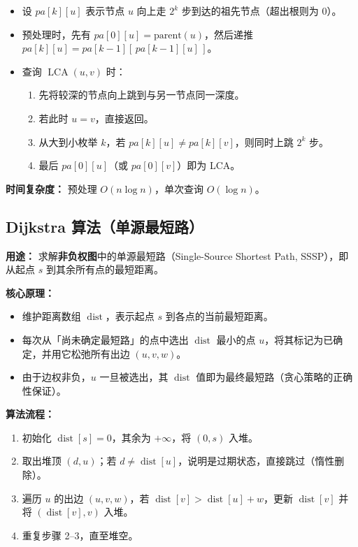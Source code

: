 \begin{itemize}
  \item 设 $pa[k][u]$ 表示节点 $u$ 向上走 $2^k$ 步到达的祖先节点（超出根则为 $0$）。
  \item 预处理时，先有 $pa[0][u] = \text{parent}(u)$，然后递推 $pa[k][u] = pa[k-1][\,pa[k-1][u]\,]$。
  \item 查询 $\operatorname{LCA}(u, v)$ 时：
    \begin{enumerate}
      \item 先将较深的节点向上跳到与另一节点同一深度。
      \item 若此时 $u = v$，直接返回。
      \item 从大到小枚举 $k$，若 $pa[k][u] \neq pa[k][v]$，则同时上跳 $2^k$ 步。
      \item 最后 $pa[0][u]$（或 $pa[0][v]$）即为 LCA。
    \end{enumerate}
\end{itemize}

\textbf{时间复杂度：} 预处理 $O(n \log n)$，单次查询 $O(\log n)$。



\subsection{Dijkstra 算法（单源最短路）}

\textbf{用途：} 求解\textbf{非负权图}中的单源最短路（Single-Source Shortest Path, SSSP），即从起点 $s$ 到其余所有点的最短距离。

\textbf{核心原理：}

\begin{itemize}
  \item 维护距离数组 $\operatorname{dist}$，表示起点 $s$ 到各点的当前最短距离。
  \item 每次从「尚未确定最短路」的点中选出 $\operatorname{dist}$ 最小的点 $u$，将其标记为已确定，并用它松弛所有出边 $(u, v, w)$。
  \item 由于边权非负，$u$ 一旦被选出，其 $\operatorname{dist}$ 值即为最终最短路（贪心策略的正确性保证）。
\end{itemize}

\textbf{算法流程：}

\begin{enumerate}
  \item 初始化 $\operatorname{dist}[s] = 0$，其余为 $+\infty$，将 $(0, s)$ 入堆。
  \item 取出堆顶 $(d, u)$；若 $d \neq \operatorname{dist}[u]$，说明是过期状态，直接跳过（惰性删除）。
  \item 遍历 $u$ 的出边 $(u, v, w)$，若 $\operatorname{dist}[v] > \operatorname{dist}[u] + w$，更新 $\operatorname{dist}[v]$ 并将 $(\operatorname{dist}[v], v)$ 入堆。
  \item 重复步骤 2--3，直至堆空。
\end{enumerate}

